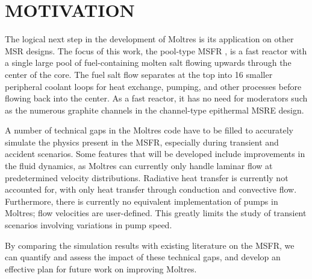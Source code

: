 \documentclass{anstrans}
\begin{document}
\section{MOTIVATION}

The logical next step in the development of Moltres is its application on other MSR designs. The focus of this work, the pool-type MSFR \cite{serp_molten_2014}, is a fast reactor with a single large pool of fuel-containing molten salt flowing upwards through the center of the core. The fuel salt flow separates at the top into 16 smaller peripheral coolant loops for heat exchange, pumping, and other processes before flowing back into the center. As a fast reactor, it has no need for moderators such as the numerous graphite channels in the channel-type epithermal MSRE design.

A number of technical gaps in the Moltres code have to be filled to accurately simulate the physics present in the MSFR, especially during transient and accident scenarios. Some features that will be developed include improvements in the fluid dynamics, as Moltres can currently only handle laminar flow at predetermined velocity distributions. Radiative heat transfer is currently not accounted for, with only heat transfer through conduction and convective flow. Furthermore, there is currently no equivalent implementation of pumps in Moltres; flow velocities are user-defined. This greatly limits the study of transient scenarios involving variations in pump speed. 

By comparing the simulation results with existing literature on the MSFR, we can quantify and assess the impact of these technical gaps, and develop an effective plan for future work on improving Moltres.



\end{document}
